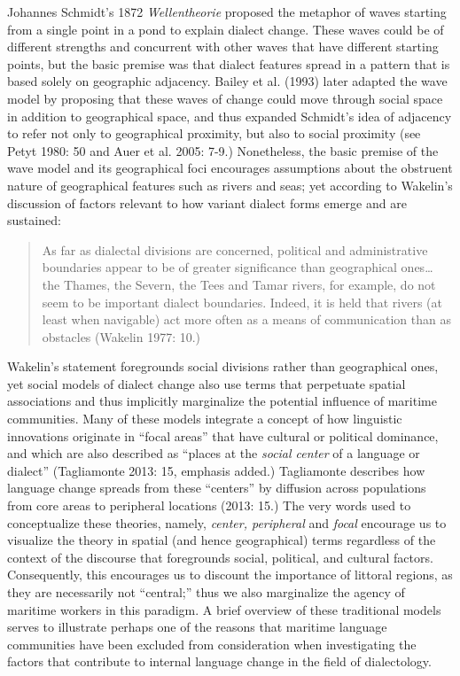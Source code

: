 \documentclass[12pt]{article}
\newenvironment{styleStandard}{\renewcommand\baselinestretch{1.0}\setlength\leftskip{0cm}\setlength\rightskip{0cm plus 1fil}\setlength\parindent{0cm}\setlength\parfillskip{0pt plus 1fil}\setlength\parskip{0in plus 1pt}\writerlistparindent\writerlistleftskip\leavevmode\normalfont\normalsize\writerlistlabel\ignorespaces}{\unskip\vspace{0in plus 1pt}\par}
\newcommand\writerlistleftskip{}
\newcommand\writerlistparindent{}
\newcommand\writerlistlabel{}
\begin{document}
\begin{styleStandard}
Johannes Schmidt’s 1872 \textit{Wellentheorie} proposed the metaphor of waves starting from a single point in a pond to explain dialect change. These waves could be of different strengths and concurrent with other waves that have different starting points, but the basic premise was that dialect features spread in a pattern that is based solely on geographic adjacency. Bailey et al. (1993) later adapted the wave model by proposing that these waves of change could move through social space in addition to geographical space, and thus expanded Schmidt’s idea of adjacency to refer not only to geographical proximity, but also to social proximity (see Petyt 1980: 50 and Auer et al. 2005: 7-9.) Nonetheless, the basic premise of the wave model and its geographical foci encourages assumptions about the obstruent nature of geographical features such as rivers and seas; yet according to Wakelin’s discussion of factors relevant to how variant dialect forms emerge and are sustained: 
\end{styleStandard}


\begin{quotation}
As far as dialectal divisions are concerned, political and administrative boundaries appear to be of greater significance than geographical ones… the Thames, the Severn, the Tees and Tamar rivers, for example, do not seem to be important dialect boundaries. Indeed, it is held that rivers (at least when navigable) act more often as a means of communication than as obstacles (Wakelin 1977: 10.)

\end{quotation}
\begin{styleStandard}
Wakelin’s statement foregrounds social divisions rather than geographical ones, yet social models of dialect change also use terms that perpetuate spatial associations and thus implicitly marginalize the potential influence of maritime communities. Many of these models integrate a concept of how linguistic innovations originate in “focal areas” that have cultural or political dominance, and which are also described as “places at the \textit{social center} of a language or dialect” (Tagliamonte 2013: 15, emphasis added.) Tagliamonte describes how language change spreads from these “centers” by diffusion across populations from core areas to peripheral locations (2013: 15.) The very words used to conceptualize these theories, namely, \textit{center, peripheral }and\textit{ focal} encourage us to visualize the theory in spatial (and hence geographical) terms regardless of the context of the discourse that foregrounds social, political, and cultural factors. Consequently, this encourages us to discount the importance of littoral regions, as they are necessarily not “central;” thus we also marginalize the agency of maritime workers in this paradigm. A brief overview of these traditional models serves to illustrate perhaps one of the reasons that maritime language communities have been excluded from consideration when investigating the factors that contribute to internal language change in the field of dialectology. 
\end{styleStandard}
\end{document}
